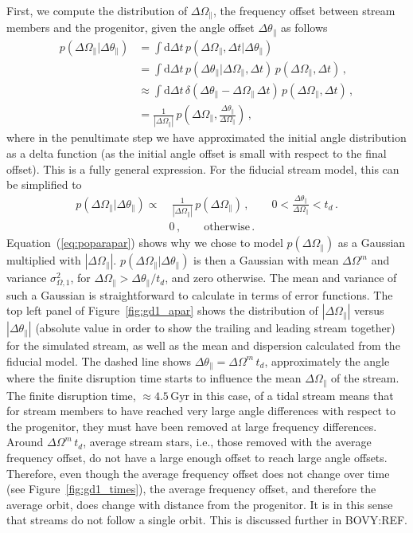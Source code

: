 \documentclass[12pt,preprint]{aastex}
\newcommand{\ie}{i.e.}
\newcommand{\dd}{\mathrm{d}}
\newcommand{\Eqnname}{Equation}
\renewcommand{\figurename}{Figure}
\newcommand{\Gyr}{\ensuremath{\,\mathrm{Gyr}}}
\newcommand{\apar}{\ensuremath{\theta_\parallel}}
\newcommand{\opar}{\ensuremath{\Omega_\parallel}}
\begin{document}
First, we compute the distribution of $\Delta \opar$, the frequency
offset between stream members and the progenitor, given the angle
offset $\Delta \apar$ as follows
\begin{equation}\label{eq:poparapargeneral}
\begin{split}
  p(\Delta \opar|\Delta \apar) & = \int \dd \Delta t\,p(\Delta \opar,\Delta t|\Delta \apar)\, \\
  & = \int \dd \Delta t \,p(\Delta \apar | \Delta \opar,\Delta t)\,p(\Delta \opar,\Delta t)\,,\\
  & \approx \int \dd \Delta t \,\delta(\Delta \apar - \Delta \opar\,\Delta t)\,p(\Delta \opar,\Delta t)\,,\\
  & = \frac{1}{\left|\Delta \opar\right|}\,p(\Delta \opar,\frac{\Delta \apar}{\Delta \opar})\,,
\end{split}
\end{equation}
where in the penultimate step we have approximated the initial angle
distribution as a delta function (as the initial angle offset is small
with respect to the final offset). This is a fully general
expression. For the fiducial stream model, this can be simplified to
\begin{equation}\label{eq:poparapar}
\begin{split}
  p(\Delta \opar|\Delta \apar) \propto &\ \frac{1}{\left|\Delta \opar\right|}\,p(\Delta \opar)\,,\qquad 0 < \frac{\Delta \apar}{\Delta \opar} < t_d\,.\\
  & 0\,,\qquad \mathrm{otherwise}\,.
\end{split}
\end{equation}
\Eqnname~(\ref{eq:poparapar}) shows why we chose to model
$p(\Delta \opar)$ as a Gaussian multiplied with $|\Delta
\opar|$. $p(\Delta \opar|\Delta \apar)$ is then a Gaussian with mean
$\Delta \Omega^m$ and variance $\sigma^2_{\Omega,1}$, for $\Delta
\opar > \Delta \apar / t_d$, and zero otherwise. The mean and variance
of such a Gaussian is straightforward to calculate in terms of error
functions. The top left panel of \figurename~\ref{fig:gd1_apar} shows
the distribution of $|\Delta \opar|$ versus $|\Delta \apar|$ (absolute
value in order to show the trailing and leading stream together) for
the simulated stream, as well as the mean and dispersion calculated
from the fiducial model. The dashed line shows $\Delta \apar = \Delta
\Omega^m \,t_d$, approximately the angle where the finite disruption
time starts to influence the mean $\Delta \opar$ of the stream. The
finite disruption time, $\approx 4.5\Gyr$ in this case, of a tidal
stream means that for stream members to have reached very large angle
differences with respect to the progenitor, they must have been
removed at large frequency differences. Around $\Delta \Omega^m
\,t_d$, average stream stars, \ie, those removed with the average
frequency offset, do not have a large enough offset to reach large
angle offsets. Therefore, even though the average frequency offset
does not change over time (see \figurename~\ref{fig:gd1_times}), the
average frequency offset, and therefore the average orbit, does change
with distance from the progenitor. It is in this sense that streams do
not follow a single orbit. This is discussed further in BOVY:REF.
\end{document}
